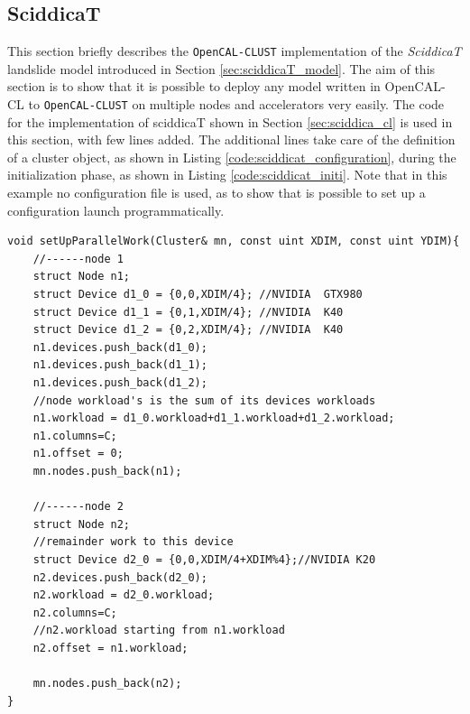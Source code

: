 \subsection{SciddicaT}
\label{sec:sciddica_opencal_cluster}
This section briefly describes the \texttt{OpenCAL-CLUST} implementation of the \textit{SciddicaT} landslide model introduced in Section \ref{sec:sciddicaT_model}.
The aim of this section is to show that it is possible to deploy any model written in OpenCAL-CL to \texttt{OpenCAL-CLUST} on multiple nodes and accelerators very easily. 
The code for the implementation of sciddicaT shown in Section \ref{sec:sciddica_cl} is used in this section, with few lines added.
The additional lines take care of the definition of a cluster object, as shown in Listing \ref{code:sciddicat_configuration}, during the initialization phase, as shown in Listing \ref{code:sciddicat_initi}.
Note that in this example no configuration file is used, as to show that is possible to set up a configuration launch programmatically.

\begin{lstlisting}
void setUpParallelWork(Cluster& mn, const uint XDIM, const uint YDIM){
    //------node 1
    struct Node n1;
    struct Device d1_0 = {0,0,XDIM/4}; //NVIDIA  GTX980
    struct Device d1_1 = {0,1,XDIM/4}; //NVIDIA  K40
    struct Device d1_2 = {0,2,XDIM/4}; //NVIDIA  K40    
    n1.devices.push_back(d1_0);
    n1.devices.push_back(d1_1);
    n1.devices.push_back(d1_2);
    //node workload's is the sum of its devices workloads
    n1.workload = d1_0.workload+d1_1.workload+d1_2.workload;
    n1.columns=C;
    n1.offset = 0;
    mn.nodes.push_back(n1);
    
    //------node 2
    struct Node n2;
    //remainder work to this device
    struct Device d2_0 = {0,0,XDIM/4+XDIM%4};//NVIDIA K20
    n2.devices.push_back(d2_0);
    n2.workload = d2_0.workload;
    n2.columns=C;
    //n2.workload starting from n1.workload
    n2.offset = n1.workload;
    
    mn.nodes.push_back(n2);
}
\end{lstlisting}



